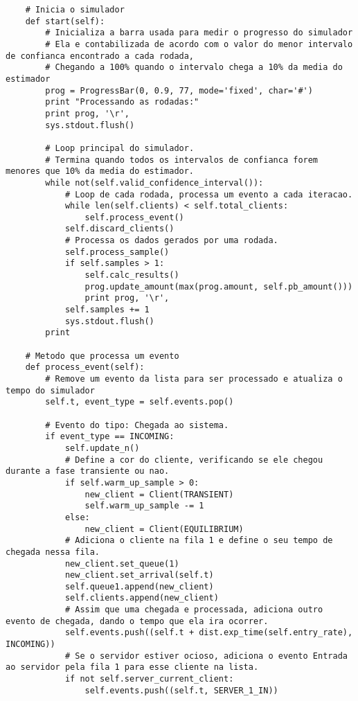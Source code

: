 \begin{lstlisting}
    # Inicia o simulador
    def start(self):
        # Inicializa a barra usada para medir o progresso do simulador
        # Ela e contabilizada de acordo com o valor do menor intervalo de confianca encontrado a cada rodada,
        # Chegando a 100% quando o intervalo chega a 10% da media do estimador
        prog = ProgressBar(0, 0.9, 77, mode='fixed', char='#')
        print "Processando as rodadas:"
        print prog, '\r',
        sys.stdout.flush()
        
        # Loop principal do simulador.
        # Termina quando todos os intervalos de confianca forem menores que 10% da media do estimador.
        while not(self.valid_confidence_interval()):
            # Loop de cada rodada, processa um evento a cada iteracao.
            while len(self.clients) < self.total_clients:
                self.process_event()
            self.discard_clients()
            # Processa os dados gerados por uma rodada.
            self.process_sample()
            if self.samples > 1:
                self.calc_results()
                prog.update_amount(max(prog.amount, self.pb_amount()))
                print prog, '\r',
            self.samples += 1
            sys.stdout.flush()
        print
    
    # Metodo que processa um evento
    def process_event(self): 
        # Remove um evento da lista para ser processado e atualiza o tempo do simulador
        self.t, event_type = self.events.pop()

        # Evento do tipo: Chegada ao sistema.
        if event_type == INCOMING:
            self.update_n()
            # Define a cor do cliente, verificando se ele chegou durante a fase transiente ou nao.
            if self.warm_up_sample > 0:
                new_client = Client(TRANSIENT)
                self.warm_up_sample -= 1
            else:
                new_client = Client(EQUILIBRIUM)
            # Adiciona o cliente na fila 1 e define o seu tempo de chegada nessa fila.
            new_client.set_queue(1)
            new_client.set_arrival(self.t)
            self.queue1.append(new_client)
            self.clients.append(new_client)
            # Assim que uma chegada e processada, adiciona outro evento de chegada, dando o tempo que ela ira ocorrer.
            self.events.push((self.t + dist.exp_time(self.entry_rate), INCOMING))
            # Se o servidor estiver ocioso, adiciona o evento Entrada ao servidor pela fila 1 para esse cliente na lista.
            if not self.server_current_client:
                self.events.push((self.t, SERVER_1_IN))


\end{lstlisting}
